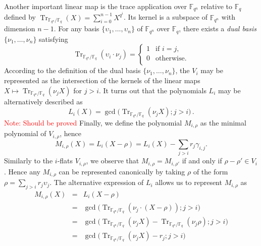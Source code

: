 \documentclass{article}
\newcommand{\ff}[1]{\mathbb{F}_{#1}}
\newcommand{\qq}{q}
\newcommand{\nn}{n}
\newcommand{\qn}{{\qq^\nn}}
\newcommand{\basef}{\ff{\qq}}
\newcommand{\extf}{\ff{\qn}}
\DeclareMathOperator{\Tr}{Tr}
\DeclareMathOperator{\Ker}{Ker}
\newcommand{\Notes}[1]{\textcolor{red}{Note: #1}}
\begin{document}
Another important linear map is the trace application over $\extf$ relative to $\basef$ defined by $\Tr_{\extf/\basef}(X)=\sum_{i=0}^{n-1} X^{\qq^i}$. Its kernel is a subspace of $\extf$ with dimension $n-1$. For any basis $\{\upsilon_1,\ldots,\upsilon_\nn\}$ of $\extf$ over $\basef$, there exists a \emph{dual basis} $\{\nu_1,\ldots,\nu_\nn\}$ satisfying
$$
\Tr_{\extf/\basef}(\upsilon_i \cdot \nu_j)=
\left\{
\begin{array}{ll}
1 & \mbox{if } i=j, \\
0 &  \mbox{otherwise}. \\
\end{array}
\right.
$$
According to the definition of the dual  basis $\{\nu_1,\ldots,\nu_\nn\}$, the $V_i$ may be represented as 
the intersection of the kernels of the linear maps $X \mapsto \Tr_{\extf/\basef}(\nu_j X )$ for $j>i$. It turns out that the polynomials 
 $L_i$ may be alternatively described as
 \begin{equation}
 \label{L_i_alt_formula}
 L_i(X)=\gcd\bigl(\Tr_{\extf/\basef}(\nu_j X );j>i\bigr) \,.
 \end{equation}
 \Notes{Should be proved}
Finally, we define the polynomial $M_{i,\rho}$ as the minimal
polynomial of $V_{i,\rho}$, hence
\begin{equation}
  M_{i,\rho}(X) = L_i(X - \rho) = L_i(X) - \sum_{j>i}r_j\gamma_{i,j}.
\end{equation}
Similarly to the $i$-flats $V_{i,\rho}$, we observe that $M_{i,\rho}=M_{i,\rho'}$ if and only if $\rho-\rho'\in V_i$. Hence
any $M_{i,\rho}$ can be represented canonically by taking $\rho$ of
the form $\rho=\sum_{j>i}r_j\upsilon_j$. The alternative expression of $L_i$ allows us to represent $M_{i,\rho}$ as
\begin{equation}
\label{alternative_M_i_rho}
\begin{array}{lll}
M_{i,\rho}(X)&=& L_i(X-\rho) \\
&=&\gcd\bigl(\Tr_{\extf/\basef}(\nu_j \cdot  (X-\rho) );j>i\bigr)  \\
&=& \gcd\bigl(\Tr_{\extf/\basef}(\nu_j X) -\Tr_{\extf/\basef}(\nu_j \rho) ;j>i\bigr)  \\
&=&  \gcd\bigl(\Tr_{\extf/\basef}(\nu_j X) -r_j ;j>i\bigr)  \\
\end{array}
\end{equation}
\end{document}
